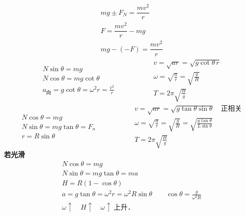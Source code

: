 
\begin{align*}
& mg\pm F_N=\dfrac{mv^2}{r}\\
& F=\dfrac{mv^2}{r}-mg\\
& mg-(-F)=\dfrac{mv^2}{r}
\end{align*}
\[
\begin{aligned}
&N\sin\theta = mg\\
&N\cos\theta = mg\cot\theta\\
&a_{\text{向}} = g\cot\theta = \omega^2 r = \frac{v^2}{r}
\end{aligned}
\qquad\qquad
\begin{aligned}
&v=\sqrt{ar}=\sqrt{g\cot\theta\,r}\\
&\omega=\sqrt{\frac{a}{r}}=\sqrt{\frac{g}{H}}\\
&T=2\pi\sqrt{\frac{H}{g}}
\end{aligned}
\]
\[
\begin{aligned}
&N\cos\theta = mg\\
&N\sin\theta = mg\tan\theta = F_n\\
&r = R\sin\theta
\end{aligned}
\qquad\qquad
\begin{aligned}
&v=\sqrt{ar}=\sqrt{g\tan\theta\sin\theta}\quad\text{正相关}\\
&\omega=\sqrt{\frac{a}{r}}=\sqrt{\frac{g}{H}}=\sqrt{\frac{g\tan\theta}{L\sin\theta}}\\
&T=2\pi\sqrt{\frac{H}{g}}
\end{aligned}
\]
\textbf{若光滑}
\begin{align*}
&N\cos\theta = mg\\
&N\sin\theta = mg\tan\theta = ma\\
&H = R(1-\cos\theta)\\
&a = g\tan\theta = \omega^2 r = \omega^2 R\sin\theta \qquad \cos\theta = \frac{g}{\omega^2 R}\\
&\omega\uparrow\quad H\uparrow\quad \omega\uparrow\ \text{上升．}
\end{align*}
